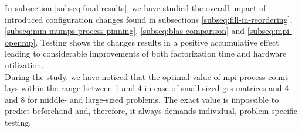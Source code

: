 

In subsection \ref{subseq:final-results}, we have studied the overall impact of introduced configuration changes found in subsections \ref{subseq:fill-in-reordering}, \ref{subseq:mm-mumps-process-pinning}, \ref{subseq:blas-comparison} and \ref{subseq:mpi-openmp}. Testing shows the changes results in a positive accumulative effect leading to considerable improvements of both factorization time and hardware utilization.\\



During the study, we have noticed that the optimal value of \gls{mpi} process count lays within the range between 1 and 4 in case of small-sized \gls{grs} matrices and 4 and 8 for middle- and large-sized problems. The exact value is impossible to predict beforehand and, therefore, it always demands individual, problem-specific testing.\\
